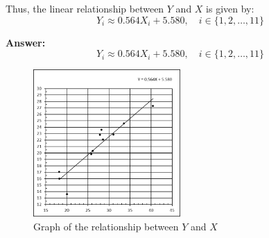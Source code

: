 \documentclass[12pt]{article}
\begin{document}
Thus, the linear relationship between \( Y \) and \( X \) is given by:
\[
Y_i \approx 0.564 X_i + 5.580, \quad i \in \{1, 2, \dots, 11\}
\]

\textbf{Answer:}
\[
Y_i \approx 0.564 X_i + 5.580, \quad i \in \{1, 2, \dots, 11\}
\]

\begin{figure}[h!]
\centering
\includegraphics[width=0.5\textwidth]{Q4-P2-graph.png}
\caption{Graph of the relationship between \( Y \) and \( X \)}
\end{figure}
\end{document}
